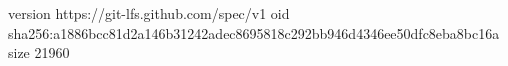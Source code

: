 version https://git-lfs.github.com/spec/v1
oid sha256:a1886bcc81d2a146b31242adec8695818c292bb946d4346ee50dfc8eba8bc16a
size 21960
